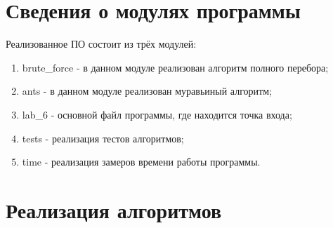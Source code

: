 \section{Сведения о модулях программы}

Реализованное ПО состоит из трёх модулей:
\begin{enumerate}
	\item brute\_force - в данном модуле реализован алгоритм полного перебора;
	\item ants - в данном модуле реализован муравьиный алгоритм;
	\item lab\_6 - основной файл программы, где находится точка входа;
	\item tests - реализация тестов алгоритмов;
	\item time - реализация замеров времени работы программы.
\end{enumerate}

\section{Реализация алгоритмов}

